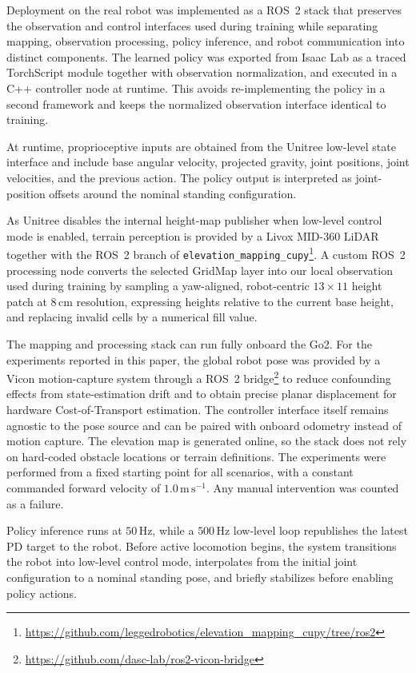 \documentclass{article}
\begin{document}
    Deployment on the real robot was implemented as a ROS~2 stack that preserves the observation and control interfaces used during training while separating mapping, observation processing, policy inference, and robot communication into distinct components. The learned policy was exported from Isaac Lab as a traced TorchScript module together with observation normalization, and executed in a C++ controller node at runtime. This avoids re-implementing the policy in a second framework and keeps the normalized observation interface identical to training.
	
    At runtime, proprioceptive inputs are obtained from the Unitree low-level state interface and include base angular velocity, projected gravity, joint positions, joint velocities, and the previous action. The policy output is interpreted as joint-position offsets around the nominal standing configuration.
    
    As Unitree disables the internal height-map publisher when low-level control mode is enabled, terrain perception is provided by a Livox MID-360 LiDAR together with the ROS~2 branch of \texttt{elevation\_mapping\_cupy}\footnote{\url{https://github.com/leggedrobotics/elevation_mapping_cupy/tree/ros2}}. A custom ROS~2 processing node converts the selected GridMap layer into our local observation used during training by sampling a yaw-aligned, robot-centric \(13\times 11\) height patch at \(8\,\mathrm{cm}\) resolution, expressing heights relative to the current base height, and replacing invalid cells by a numerical fill value.
    
    The mapping and processing stack can run fully onboard the Go2. For the experiments reported in this paper, the global robot pose was provided by a Vicon motion-capture system through a ROS~2 bridge\footnote{\url{https://github.com/dasc-lab/ros2-vicon-bridge}} to reduce confounding effects from state-estimation drift and to obtain precise planar displacement for hardware Cost-of-Transport estimation. The controller interface itself remains agnostic to the pose source and can be paired with onboard odometry instead of motion capture. The elevation map is generated online, so the stack does not rely on hard-coded obstacle locations or terrain definitions. The experiments were performed from a fixed starting point for all scenarios, with a constant commanded forward velocity of \(1.0\,\mathrm{m\,s^{-1}}\). Any manual intervention was counted as a failure.
	
    Policy inference runs at \(50\,\mathrm{Hz}\), while a \(500\,\mathrm{Hz}\) low-level loop republishes the latest PD target to the robot. Before active locomotion begins, the system transitions the robot into low-level control mode, interpolates from the initial joint configuration to a nominal standing pose, and briefly stabilizes before enabling policy actions.
\end{document}
